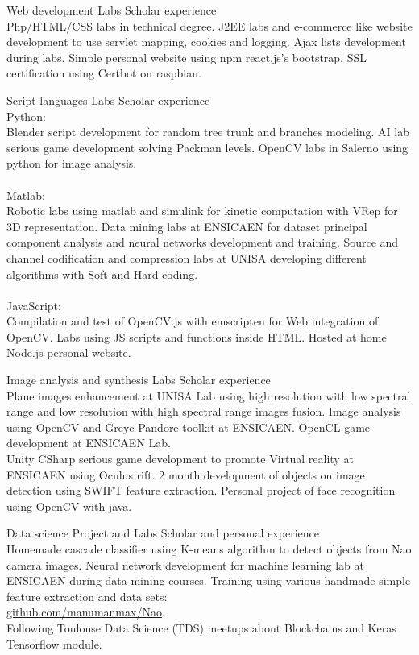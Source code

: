 \documentclass{tccv-master/tccv}
\begin{document}
\begin{eventlist}
\item{Web development}
{Labs}
{Scholar experience}\\
Php/HTML/CSS labs in technical degree.
J2EE labs and e-commerce like website development to use servlet mapping, cookies and logging.
Ajax lists development during labs.
Simple personal website using npm react.js's bootstrap.
SSL certification using Certbot on raspbian.

\item{Script languages}
{Labs}
{Scholar experience}\\
Python: \\
Blender script development for random tree trunk and branches modeling. 
AI lab serious game development solving Packman levels.
OpenCV labs in Salerno using python for image analysis.\\\\
Matlab:\\
Robotic labs using matlab and simulink for kinetic computation with VRep for 3D representation.
Data mining labs at ENSICAEN for dataset principal component analysis and neural networks development and training.
Source and channel codification and compression labs at UNISA developing different algorithms with Soft and Hard coding.\\\\
JavaScript:\\
Compilation and test of OpenCV.js with emscripten for Web integration of OpenCV.
Labs using JS scripts and functions inside HTML.
Hosted at home Node.js personal website.

\item
{Image analysis and synthesis}
{Labs}
{Scholar experience}\\
Plane images enhancement at UNISA Lab using high resolution with low spectral range and low resolution with high spectral range images fusion.
Image analysis using OpenCV and Greyc Pandore toolkit at ENSICAEN.
OpenCL game development at ENSICAEN Lab.\\
Unity CSharp serious game development to promote Virtual reality at ENSICAEN using Oculus rift. 2 month development of objects on image detection using SWIFT feature extraction.
Personal project of face recognition using OpenCV with java.

\item
{Data science}
{Project and Labs}
{Scholar and personal experience}\\
Homemade cascade classifier using K-means algorithm to detect objects from Nao camera images.
Neural network development for machine learning lab at ENSICAEN during data mining courses.
Training using various handmade simple feature extraction and data sets:\\
\href{https://github.com/manumanmax/Nao}{github.com/manumanmax/Nao}.\\
Following Toulouse Data Science (TDS) meetups about Blockchains and Keras Tensorflow module.


\end{eventlist}
\end{document}
